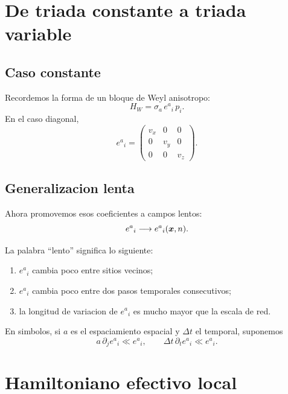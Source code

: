 \section{De triada constante a triada variable}
\subsection{Caso constante}
Recordemos la forma de un bloque de Weyl anisotropo:
\begin{equation}
H_W = \sigma_a\, e^a{}_i\, p_i.
\label{c23:eq:WeylTriadConst}
\end{equation}
En el caso diagonal,
\begin{equation}
e^a{}_i=
\begin{pmatrix}
v_x & 0 & 0\\
0 & v_y & 0\\
0 & 0 & v_z
\end{pmatrix}.
\end{equation}

\subsection{Generalizacion lenta}
Ahora promovemos esos coeficientes a campos lentos:
\begin{equation}
e^a{}_i \longrightarrow e^a{}_i(\bm{x},n).
\label{c23:eq:triadVariable}
\end{equation}

La palabra \enquote{lento} significa lo siguiente:
\begin{enumerate}[label=\arabic*.]
    \item \(e^a{}_i\) cambia poco entre sitios vecinos;
    \item \(e^a{}_i\) cambia poco entre dos pasos temporales consecutivos;
    \item la longitud de variacion de \(e^a{}_i\) es mucho mayor que la escala de red.
\end{enumerate}

En simbolos, si \(a\) es el espaciamiento espacial y \(\Delta t\) el temporal, suponemos
\begin{equation}
a\,\partial_j e^a{}_i \ll e^a{}_i,
\qquad
\Delta t\,\partial_t e^a{}_i \ll e^a{}_i.
\label{c23:eq:slowvariation}
\end{equation}

\section{Hamiltoniano efectivo local}
